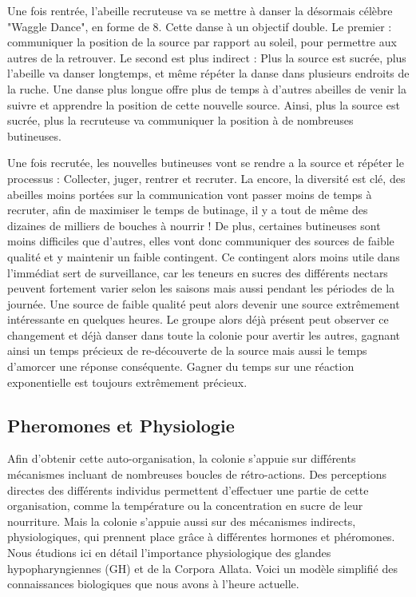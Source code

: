 			Une fois rentrée, l'abeille recruteuse va se mettre à danser la désormais célèbre "Waggle Dance", en forme de 8. Cette danse à un objectif double. Le premier : communiquer la position de la source par rapport au soleil, pour permettre aux autres de la retrouver. Le second est plus indirect : Plus la source est sucrée, plus l'abeille va danser longtemps, et même répéter la danse dans plusieurs endroits de la ruche. Une danse plus longue offre plus de temps à d'autres abeilles de venir la suivre et apprendre la position de cette nouvelle source. Ainsi, plus la source est sucrée, plus la recruteuse va communiquer la position à de nombreuses butineuses.
			
			Une fois recrutée, les nouvelles butineuses vont se rendre a la source et répéter le processus : Collecter, juger, rentrer et recruter. La encore, la diversité est clé, des abeilles moins portées sur la communication vont passer moins de temps à recruter, afin de maximiser le temps de butinage, il y a tout de même des dizaines de milliers de bouches à nourrir ! De plus, certaines butineuses sont moins difficiles que d'autres, elles vont donc communiquer des sources de faible qualité et y maintenir un faible contingent. Ce contingent alors moins utile dans l'immédiat sert de surveillance, car les teneurs en sucres des différents nectars peuvent fortement varier selon les saisons mais aussi pendant les périodes de la journée. Une source de faible qualité peut alors devenir une source extrêmement intéressante en quelques heures. Le groupe alors déjà présent peut observer ce changement et déjà danser dans toute la colonie pour avertir les autres, gagnant ainsi un temps précieux de re-découverte de la source mais aussi le temps d'amorcer une réponse conséquente. Gagner du temps sur une réaction exponentielle est toujours extrêmement précieux.
			
		\subsection{Pheromones et Physiologie}
			Afin d'obtenir cette auto-organisation, la colonie s'appuie sur différents mécanismes incluant de nombreuses boucles de rétro-actions. Des perceptions directes des différents individus permettent d'effectuer une partie de cette organisation, comme la température ou la concentration en sucre de leur nourriture. Mais la colonie s'appuie aussi sur des mécanismes indirects, physiologiques, qui prennent place grâce à différentes hormones et phéromones. Nous étudions ici en détail l'importance physiologique des glandes hypopharyngiennes (GH) et de la Corpora Allata. Voici un modèle simplifié des connaissances biologiques que nous avons à l'heure actuelle.
			
